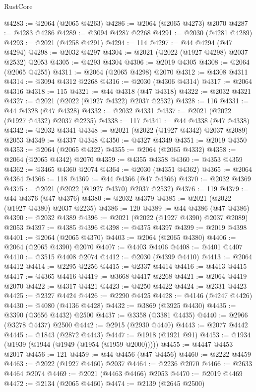 \begin{lexlean}{RustCore}
\begin{coremodule}
@4283 := @2064 (@2065 @4263)
@4286 := @2064 (@2065 @4273) @2070
@4287 := @4283 @4286
@4289 := @3094 @4287 @2268
@4291 := @2030 (@4281 @4289)
@4293 := @2021 (@4258 @4291)
@4294 := 114
@4297 := @44 @4294 (@47 @4294)
@4298 := @2032 @4297
@4304 := @2021 (@2022 (@1927 @4298) @2037 @2532) @2053
@4305 := @4293 @4304
@4306 := @2019 @4305
@4308 := @2064 (@2065 @4255)
@4311 := @2064 (@2065 @4298) @2070
@4312 := @4308 @4311
@4314 := @3094 @4312 @2268
@4316 := @2030 (@4306 @4314)
@4317 := @2064 @4316
@4318 := 115
@4321 := @44 @4318 (@47 @4318)
@4322 := @2032 @4321
@4327 := @2021 (@2022 (@1927 @4322) @2037 @2532)
@4328 := 116
@4331 := @44 @4328 (@47 @4328)
@4332 := @2032 @4331
@4337 := @2021 (@2022 (@1927 @4332) @2037 @2235)
@4338 := 117
@4341 := @44 @4338 (@47 @4338)
@4342 := @2032 @4341
@4348 := @2021 (@2022 (@1927 @4342) @2037 @2089) @2053
@4349 := @4337 @4348
@4350 := @4327 @4349
@4351 := @2019 @4350
@4353 := @2064 (@2065 @4322)
@4355 := @2064 (@2065 @4332)
@4358 := @2064 (@2065 @4342) @2070
@4359 := @4355 @4358
@4360 := @4353 @4359
@4362 := @3465 @4360 @2074
@4364 := @2030 (@4351 @4362)
@4365 := @2064 @4364
@4366 := 118
@4369 := @44 @4366 (@47 @4366)
@4370 := @2032 @4369
@4375 := @2021 (@2022 (@1927 @4370) @2037 @2532)
@4376 := 119
@4379 := @44 @4376 (@47 @4376)
@4380 := @2032 @4379
@4385 := @2021 (@2022 (@1927 @4380) @2037 @2235)
@4386 := 120
@4389 := @44 @4386 (@47 @4386)
@4390 := @2032 @4389
@4396 := @2021 (@2022 (@1927 @4390) @2037 @2089) @2053
@4397 := @4385 @4396
@4398 := @4375 @4397
@4399 := @2019 @4398
@4401 := @2064 (@2065 @4370)
@4403 := @2064 (@2065 @4380)
@4406 := @2064 (@2065 @4390) @2070
@4407 := @4403 @4406
@4408 := @4401 @4407
@4410 := @3515 @4408 @2074
@4412 := @2030 (@4399 @4410)
@4413 := @2064 @4412
@4414 := @2295 @2256
@4415 := @2337 @4414
@4416 := @4413 @4415
@4417 := @4365 @4416
@4419 := @3668 @4417 @2268
@4421 := @2064 @4419 @2070
@4422 := @4317 @4421
@4423 := @4250 @4422
@4424 := @2331 @4423
@4425 := @2327 @4424
@4426 := @2290 @4425
@4428 := @4146 (@4247 @4426)
@4430 := @4080 (@4136 @4428)
@4432 := @3869 (@3925 @4430)
@4435 := @3390 (@3656 @4432) @2500
@4437 := @3358 (@3381 @4435)
@4440 := @2966 (@3278 @4437) @2500
@4442 := @2915 (@2930 @4440)
@4443 := @2077 @4442
@4445 := @1843 (@2872 @4443)
@4447 := @1918 (@1921 @91)
@4453 := @1934 (@1939 (@1944 (@1949 (@1954 (@1959 @2000)))))
@4455 := @4447 @4453 @2017
@4456 := 121
@4459 := @44 @4456 (@47 @4456)
@4460 := @2222 @4459
@4463 := @2022 (@1927 @4460) @2037
@4464 := @2236 @2070
@4466 := @2633 @4464 @2074
@4469 := @2021 (@4463 @4466) @2053
@4470 := @2019 @4469
@4472 := @2134 (@2065 @4460)
@4474 := @2139 (@2645 @2500)

\end{coremodule}
\end{lexlean}
